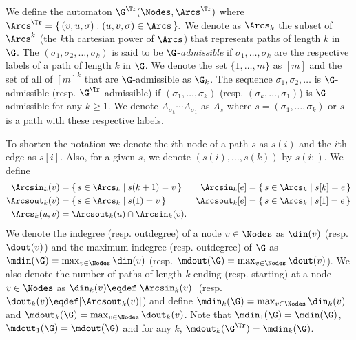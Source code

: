 We define the automaton $\G^\Tr (\Nodes,\Arcs^\Tr )$ where
\(\Arcs^\Tr  = \{\, (v,u,\sigma) : (u,v,\sigma)\\\in \Arcs \,\}.\)
We denote as $\Arcs_k$ the subset of $\Arcs^k$ (the $k$th cartesian power of $\Arcs$) that represents paths of length $k$ in $\G$.
The  $(\sigma_1, \sigma_2, \ldots, \sigma_k)$ is said to be $\G$-\emph{admissible} if $\sigma_1, \ldots, \sigma_k$ are the respective labels of a path of length $k$ in $\G$.
We denote the set $\{1, \ldots, m\}$ as $[m]$ and the set of all  of $[m]^k$ that are $\G$-admissible as $\G_k$.
The sequence $\sigma_1, \sigma_2, \ldots$ is $\G$-admissible (resp. $\G^\Tr $-admissible) if $(\sigma_1, \ldots, \sigma_k)$ (resp. $(\sigma_k, \ldots, \sigma_1)$) is $\G$-admissible for any $k \geq 1$.
We denote $A_{\sigma_k}\cdots A_{\sigma_1}$ as $A_s$ where $s = (\sigma_1, \ldots, \sigma_k)$ or $s$ is a path with these respective labels.

To shorten the notation we denote the $i$th node of a path $s$ as
$s(i)$ and the $i$th edge as $s[i]$.
Also, for a given  $s$, we denote $(s(i),\ldots,s(k))$ by $s(i:)$.
We define
\begin{align*}
  \Arcsin_k(v) & = \{\, s \in \Arcs_k \mid s(k+1) = v \,\} &
  \Arcsin_k[e] & = \{\, s \in \Arcs_k \mid s[k] = e \,\}\\
  \Arcsout_k(v) & = \{\, s \in \Arcs_k \mid s(1) = v \,\} &
  \Arcsout_k[e] & = \{\, s \in \Arcs_k \mid s[1] = e \,\}\\
  \Arcs_k(u, v) & = \Arcsout_k(u) \cap \Arcsin_k(v).
\end{align*}
We denote the indegree (resp. outdegree) of a node $v \in \Nodes$ as
$\din(v)$ (resp. $\dout(v)$) and the maximum indegree (resp.
outdegree) of $\G$ as $\mdin(\G) = \max_{v \in \Nodes} \din(v)$ (resp.
$\mdout(\G) = \max_{v \in \Nodes} \dout(v)$).
We also denote the number of paths of length $k$ ending (resp.
starting) at a node $v \in \Nodes$ as $\din_k(v) \eqdef |\Arcsin_k(v)|$ (resp. $\dout_k(v) \eqdef |\Arcsout_k(v)|$)
and define $\mdin_k(\G) = \max_{v \in \Nodes} \din_k(v)$ and
$\mdout_k(\G) = \max_{v \in \Nodes} \dout_k(v)$.
Note that $\mdin_1(\G) = \mdin(\G)$, $\mdout_1(\G) = \mdout(\G)$ and
for any $k$, $\mdout_k(\G^\Tr) = \mdin_k(\G)$.
